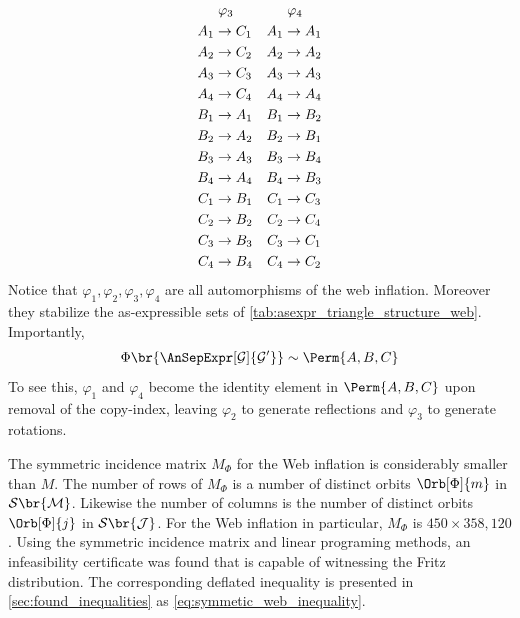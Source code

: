 \documentclass[aps, 10pt, english, twoside, pra, nofootinbib, tightenlines, longbibliography, superscriptaddress]{revtex4-1}
\renewcommand{\Events}[1]{\mathcal{S}\br{#1}} %
\begin{document}
\begin{equation*}
\begin{aligned}[c]
    &\hspace{1mm}\varphi_3 \\
    A_1 &\to C_1 \\A_2 &\to C_2 \\A_3 &\to C_3 \\A_4 &\to C_4 \\B_1 &\to A_1 \\B_2 &\to A_2 \\B_3 &\to A_3 \\B_4 &\to A_4 \\C_1 &\to B_1 \\C_2 &\to B_2 \\C_3 &\to B_3 \\C_4 &\to B_4
    \end{aligned}
    \quad
    \begin{aligned}[c]
    &\hspace{1mm}\varphi_4 \\
    A_1 &\to A_1 \\A_2 &\to A_2 \\A_3 &\to A_3 \\A_4 &\to A_4 \\B_1 &\to B_2 \\B_2 &\to B_1 \\B_3 &\to B_4 \\B_4 &\to B_3 \\C_1 &\to C_3 \\C_2 &\to C_4 \\C_3 &\to C_1 \\C_4 &\to C_2
    \end{aligned}
    \end{equation*}
    Notice that $\varphi_1, \varphi_2, \varphi_3, \varphi_4$ are all automorphisms of the web inflation. Moreover they stabilize the as-expressible sets of \cref{tab:asexpr_triangle_structure_web}. Importantly,
    \[ \gp\br{\AnSepExpr[\graph]{\graph'}} \sim \Perm{A,B,C} \]
    To see this, $\varphi_1$ and $\varphi_4$ become the identity element in $\Perm{A,B,C}$ upon removal of the copy-index, leaving $\varphi_2$ to generate reflections and $\varphi_3$ to generate rotations.

    The symmetric incidence matrix $M_{\Phi}$ for the Web inflation is considerably smaller than $M$. The number of rows of $M_{\Phi}$ is a number of distinct orbits $\Orb[\Phi]{m}$ in $\Events{\mscenario}$. Likewise the number of columns is the number of distinct orbits $\Orb[\Phi]{j}$ in $\Events{\jointvar}$. For the Web inflation in particular, $M_{\Phi}$ is $450 \times 358,120$. Using the symmetric incidence matrix and linear programing methods, an infeasibility certificate was found that is capable of witnessing the Fritz distribution. The corresponding deflated inequality is presented in \cref{sec:found_inequalities} as \cref{eq:symmetic_web_inequality}.
\end{document}
